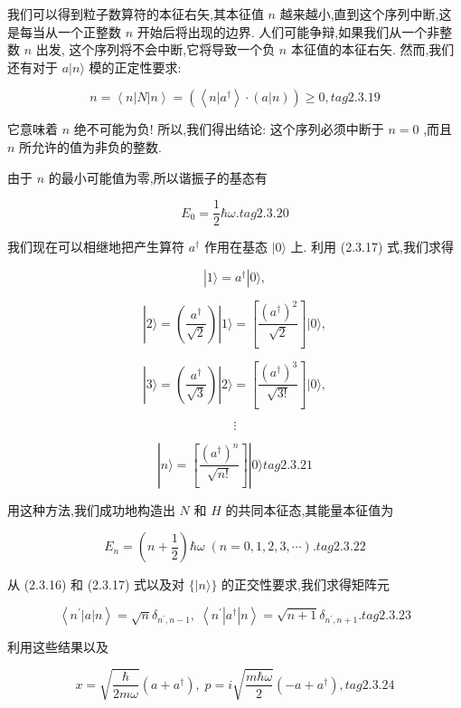 \documentclass[lang=cn,newtx,10pt,scheme=chinese,thmcnt=section]{elegantbook}
\begin{document}
我们可以得到粒子数算符的本征右矢,其本征值 $n$ 越来越小,直到这个序列中断,这是每当从一个正整数 $n$ 开始后将出现的边界. 人们可能争辩,如果我们从一个非整数 $n$ 出发, 这个序列将不会中断,它将导致一个负 $n$ 本征值的本征右矢. 然而,我们还有对于 $a | n\rangle$ 模的正定性要求:

$$
n = \left\langle {n\left| N\right| n}\right\rangle = \left( {\left\langle {n | {a}^{ \dagger }}\right\rangle \cdot \left( {a | n}\right) }\right) \geq 0, tag{2.3.19}
$$

它意味着 $n$ 绝不可能为负! 所以,我们得出结论: 这个序列必须中断于 $n = 0$ ,而且 $n$ 所允许的值为非负的整数.

由于 $n$ 的最小可能值为零,所以谐振子的基态有

$$
{E}_{0} = \frac{1}{2}\hbar \omega . tag{2.3.20}
$$

我们现在可以相继地把产生算符 ${a}^{ \dagger }$ 作用在基态 $|0\rangle$ 上. 利用 (2.3.17) 式,我们求得

$$
\left| {1\rangle = {a}^{ \dagger }}\right| 0\rangle ,
$$

$$
\left| {2\rangle = \left( \frac{{a}^{ \dagger }}{\sqrt{2}}\right) }\right| 1\rangle = \left\lbrack \frac{{\left( {a}^{ \dagger }\right) }^{2}}{\sqrt{2}}\right\rbrack |0\rangle ,
$$

$$
\left| {3\rangle = \left( \frac{{a}^{ \dagger }}{\sqrt{3}}\right) }\right| 2\rangle = \left\lbrack \frac{{\left( {a}^{ \dagger }\right) }^{3}}{\sqrt{3!}}\right\rbrack |0\rangle ,
$$

$$
\vdots
$$

$$
\left| {n\rangle = \left\lbrack \frac{{\left( {a}^{ \dagger }\right) }^{n}}{\sqrt{n!}}\right\rbrack }\right| 0\rangle tag{2.3.21}
$$

用这种方法,我们成功地构造出 $N$ 和 $H$ 的共同本征态,其能量本征值为

$$
{E}_{n} = \left( {n + \frac{1}{2}}\right) \hbar \omega \;\left( {n = 0,1,2,3,\cdots }\right) . tag{2.3.22}
$$

从 (2.3.16) 和 (2.3.17) 式以及对 $\{ |n\rangle \}$ 的正交性要求,我们求得矩阵元

$$
\left\langle {{n}^{\prime }\left| a\right| n}\right\rangle = \sqrt{n}{\delta }_{{n}^{\prime }, n - 1},\;\left\langle {{n}^{\prime }\left| {a}^{ \dagger }\right| n}\right\rangle = \sqrt{n + 1}{\delta }_{{n}^{\prime }, n + 1}. tag{2.3.23}
$$

利用这些结果以及

$$
x = \sqrt{\frac{\hbar }{2m\omega }}\left( {a + {a}^{ \dagger }}\right) ,\;p = i\sqrt{\frac{m\hbar \omega }{2}}\left( {-a + {a}^{ \dagger }}\right) , tag{2.3.24}
$$
\end{document}

